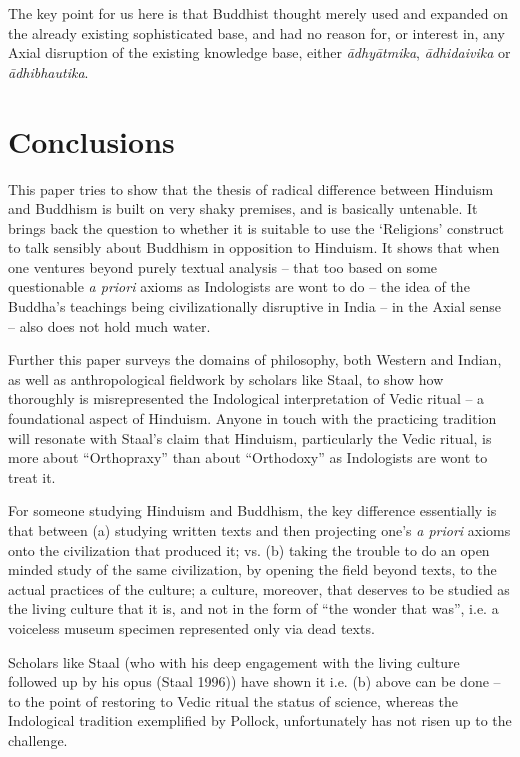 The key point for us here is that Buddhist thought merely used and expanded on the already existing sophisticated base, and had no reason for, or interest in, any Axial disruption of the existing knowledge base, either \textit{ādhyātmika}, \textit{ādhidaivika} or\textit{ ādhibhautika}.


\section*{Conclusions}

This paper tries to show that the thesis of radical difference between Hinduism and Buddhism is built on very shaky premises, and is basically untenable. It brings back the question to whether it is suitable to use the ‘Religions’ construct to talk sensibly about Buddhism in opposition to Hinduism. It shows that when one ventures beyond purely textual analysis – that too based on some questionable \textit{a priori} axioms as Indologists are wont to do – the idea of the Buddha’s teachings being civilizationally disruptive in India – in the Axial sense – also does not hold much water.

Further this paper surveys the domains of philosophy, both Western and Indian, as well as anthropological fieldwork by scholars like Staal, to show how thoroughly is misrepresented the Indological interpretation of Vedic ritual – a foundational aspect of Hinduism. Anyone in touch with the practicing tradition will resonate with Staal’s claim that Hinduism, particularly the Vedic ritual, is more about “Orthopraxy” than about “Orthodoxy” as Indologists are wont to treat it.

For someone studying Hinduism and Buddhism, the key difference essentially is that between (a) studying written texts and then projecting one’s \textit{a priori} axioms onto the civilization that produced it; vs. (b) taking the trouble to do an open minded study of the same civilization, by opening the field beyond texts, to the actual practices of the culture; a culture, moreover, that deserves to be studied as the living culture that it is, and not in the form of “the wonder that was”, i.e. a voiceless museum specimen represented only via dead texts.

Scholars like Staal (who with his deep engagement with the living culture followed up by his opus (Staal 1996)) have shown it i.e. (b) above can be done – to the point of restoring to Vedic ritual the status of science, whereas the Indological tradition exemplified by Pollock, unfortunately has not risen up to the challenge.


